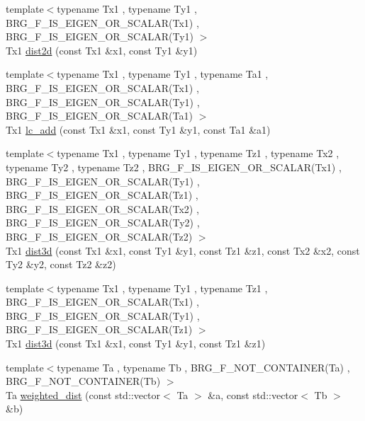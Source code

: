 \begin{DoxyCompactItemize}
\item 
{\footnotesize template$<$typename Tx1 , typename Ty1 , B\-R\-G\-\_\-\-F\-\_\-\-I\-S\-\_\-\-E\-I\-G\-E\-N\-\_\-\-O\-R\-\_\-\-S\-C\-A\-L\-A\-R(\-Tx1) , B\-R\-G\-\_\-\-F\-\_\-\-I\-S\-\_\-\-E\-I\-G\-E\-N\-\_\-\-O\-R\-\_\-\-S\-C\-A\-L\-A\-R(\-Ty1) $>$ }\\Tx1 \hyperlink{namespaceIceBRG_ac6b3d187a888e42c79d2dfd1a02ec7d7}{dist2d} (const Tx1 \&x1, const Ty1 \&y1)
\item 
{\footnotesize template$<$typename Tx1 , typename Ty1 , typename Ta1 , B\-R\-G\-\_\-\-F\-\_\-\-I\-S\-\_\-\-E\-I\-G\-E\-N\-\_\-\-O\-R\-\_\-\-S\-C\-A\-L\-A\-R(\-Tx1) , B\-R\-G\-\_\-\-F\-\_\-\-I\-S\-\_\-\-E\-I\-G\-E\-N\-\_\-\-O\-R\-\_\-\-S\-C\-A\-L\-A\-R(\-Ty1) , B\-R\-G\-\_\-\-F\-\_\-\-I\-S\-\_\-\-E\-I\-G\-E\-N\-\_\-\-O\-R\-\_\-\-S\-C\-A\-L\-A\-R(\-Ta1) $>$ }\\Tx1 \hyperlink{namespaceIceBRG_a9c4d1ff1aaf95513be4b6202bcbfe96a}{lc\-\_\-add} (const Tx1 \&x1, const Ty1 \&y1, const Ta1 \&a1)
\item 
{\footnotesize template$<$typename Tx1 , typename Ty1 , typename Tz1 , typename Tx2 , typename Ty2 , typename Tz2 , B\-R\-G\-\_\-\-F\-\_\-\-I\-S\-\_\-\-E\-I\-G\-E\-N\-\_\-\-O\-R\-\_\-\-S\-C\-A\-L\-A\-R(\-Tx1) , B\-R\-G\-\_\-\-F\-\_\-\-I\-S\-\_\-\-E\-I\-G\-E\-N\-\_\-\-O\-R\-\_\-\-S\-C\-A\-L\-A\-R(\-Ty1) , B\-R\-G\-\_\-\-F\-\_\-\-I\-S\-\_\-\-E\-I\-G\-E\-N\-\_\-\-O\-R\-\_\-\-S\-C\-A\-L\-A\-R(\-Tz1) , B\-R\-G\-\_\-\-F\-\_\-\-I\-S\-\_\-\-E\-I\-G\-E\-N\-\_\-\-O\-R\-\_\-\-S\-C\-A\-L\-A\-R(\-Tx2) , B\-R\-G\-\_\-\-F\-\_\-\-I\-S\-\_\-\-E\-I\-G\-E\-N\-\_\-\-O\-R\-\_\-\-S\-C\-A\-L\-A\-R(\-Ty2) , B\-R\-G\-\_\-\-F\-\_\-\-I\-S\-\_\-\-E\-I\-G\-E\-N\-\_\-\-O\-R\-\_\-\-S\-C\-A\-L\-A\-R(\-Tz2) $>$ }\\Tx1 \hyperlink{namespaceIceBRG_ad7d8ac9fe85a6b6c56aeac3069587606}{dist3d} (const Tx1 \&x1, const Ty1 \&y1, const Tz1 \&z1, const Tx2 \&x2, const Ty2 \&y2, const Tz2 \&z2)
\item 
{\footnotesize template$<$typename Tx1 , typename Ty1 , typename Tz1 , B\-R\-G\-\_\-\-F\-\_\-\-I\-S\-\_\-\-E\-I\-G\-E\-N\-\_\-\-O\-R\-\_\-\-S\-C\-A\-L\-A\-R(\-Tx1) , B\-R\-G\-\_\-\-F\-\_\-\-I\-S\-\_\-\-E\-I\-G\-E\-N\-\_\-\-O\-R\-\_\-\-S\-C\-A\-L\-A\-R(\-Ty1) , B\-R\-G\-\_\-\-F\-\_\-\-I\-S\-\_\-\-E\-I\-G\-E\-N\-\_\-\-O\-R\-\_\-\-S\-C\-A\-L\-A\-R(\-Tz1) $>$ }\\Tx1 \hyperlink{namespaceIceBRG_af0eb3c0dd713f6176fb1d7689b6db021}{dist3d} (const Tx1 \&x1, const Ty1 \&y1, const Tz1 \&z1)
\item 
{\footnotesize template$<$typename Ta , typename Tb , B\-R\-G\-\_\-\-F\-\_\-\-N\-O\-T\-\_\-\-C\-O\-N\-T\-A\-I\-N\-E\-R(\-Ta) , B\-R\-G\-\_\-\-F\-\_\-\-N\-O\-T\-\_\-\-C\-O\-N\-T\-A\-I\-N\-E\-R(\-Tb) $>$ }\\Ta \hyperlink{namespaceIceBRG_a80fff1ca77a46f0d13cb68c2486ed172}{weighted\-\_\-dist} (const std\-::vector$<$ Ta $>$ \&a, const std\-::vector$<$ Tb $>$ \&b)

\end{DoxyCompactItemize}
